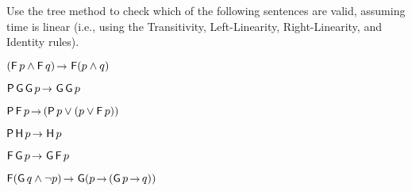 \begin{exercise}
  Use the tree method to check which of the following sentences are valid,
  assuming time is linear (i.e., using the Transitivity, Left-Linearity,
  Right-Linearity, and Identity rules).
  \begin{exlist}
  \item $(\tF p \land \tF q) \to \tF(p \land q)$
  \item $\tP\tG\tG p \to \tG\tG p$
  \item $\tP\tF p \to (\tP p \lor (p \lor \tF p))$
  \item $\tP\tH p \to \tH p$
  \item $\tF\tG p \to \tG\tF p$
  \item $\tF (\tG q \land \neg p) \to \tG(p \to (\tG p \to q))$ 
  \end{exlist}
\end{exercise}
